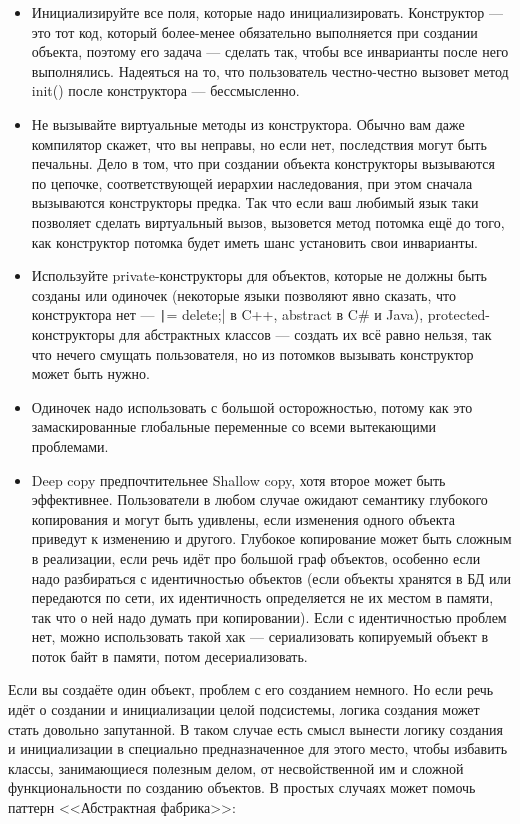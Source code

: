 \documentclass[a5paper]{article}
\begin{document}
\begin{itemize}
    \item Инициализируйте все поля, которые надо инициализировать. Конструктор --- это тот код, который более-менее обязательно выполняется при создании объекта, поэтому его задача --- сделать так, чтобы все инварианты после него выполнялись. Надеяться на то, что пользователь честно-честно вызовет метод init() после конструктора --- бессмысленно.
    \item Не вызывайте виртуальные методы из конструктора. Обычно вам даже компилятор скажет, что вы неправы, но если нет, последствия могут быть печальны. Дело в том, что при создании объекта конструкторы вызываются по цепочке, соответствующей иерархии наследования, при этом сначала вызываются конструкторы предка. Так что если ваш любимый язык таки позволяет сделать виртуальный вызов, вызовется метод потомка ещё до того, как конструктор потомка будет иметь шанс установить свои инварианты.
    \item Используйте private-конструкторы для объектов, которые не должны быть созданы или одиночек (некоторые языки позволяют явно сказать, что конструктора нет --- \texttt|= delete;| в C++, abstract в C\# и Java), protected-конструкторы для абстрактных классов --- создать их всё равно нельзя, так что нечего смущать пользователя, но из потомков вызывать конструктор может быть нужно.
    \item Одиночек надо использовать с большой осторожностью, потому как это замаскированные глобальные переменные со всеми вытекающими проблемами.
    \item Deep copy предпочтительнее Shallow copy, хотя второе может быть эффективнее. Пользователи в любом случае ожидают семантику глубокого копирования и могут быть удивлены, если изменения одного объекта приведут к изменению и другого. Глубокое копирование может быть сложным в реализации, если речь идёт про большой граф объектов, особенно если надо разбираться с идентичностью объектов (если объекты хранятся в БД или передаются по сети, их идентичность определяется не их местом в памяти, так что о ней надо думать при копировании). Если с идентичностью проблем нет, можно использовать такой хак --- сериализовать копируемый объект в поток байт в памяти, потом десериализовать.
\end{itemize}

Если вы создаёте один объект, проблем с его созданием немного. Но если речь идёт о создании и инициализации целой подсистемы, логика создания может стать довольно запутанной. В таком случае есть смысл вынести логику создания и инициализации в специально предназначенное для этого место, чтобы избавить классы, занимающиеся полезным делом, от несвойственной им и сложной функциональности по созданию объектов. В простых случаях может помочь паттерн <<Абстрактная фабрика>>:
\end{document}
